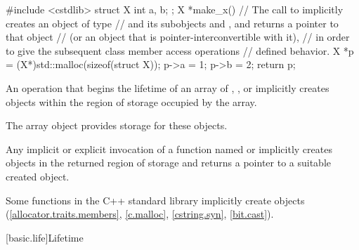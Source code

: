 \pnum
\begin{example}
\begin{codeblock}
#include <cstdlib>
struct X { int a, b; };
X *make_x() {
  // The call to  implicitly creates an object of type 
  // and its subobjects  and , and returns a pointer to that  object
  // (or an object that is pointer-interconvertible with it),
  // in order to give the subsequent class member access operations
  // defined behavior.
  X *p = (X*)std::malloc(sizeof(struct X));
  p->a = 1;
  p->b = 2;
  return p;
}
\end{codeblock}
\end{example}

\pnum
An operation that begins the lifetime of
an array of , , or 
implicitly creates objects within the region of storage occupied by the array.
\begin{note}
The array object provides storage for these objects.
\end{note}
Any implicit or explicit invocation of a function
named  or 
implicitly creates objects in the returned region of storage and
returns a pointer to a suitable created object.
\begin{note}
Some functions in the C++ standard library implicitly create objects
(\ref{allocator.traits.members}, \ref{c.malloc}, \ref{cstring.syn}, \ref{bit.cast}).
\end{note}

[basic.life]{Lifetime}


